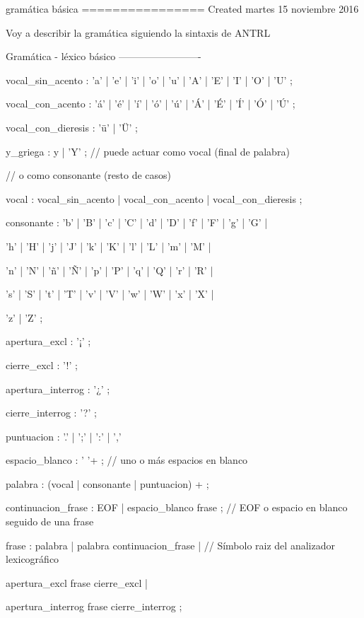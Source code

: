 \documentclass{minimal}
\begin{document}
    gramática básica
    ================
    Created martes 15 noviembre 2016
    
    Voy a describir la gramática siguiendo la sintaxis de ANTRL
    
    Gramática - léxico básico
    -------------------------
    
    vocal\_sin\_acento	: 'a' | 'e' | 'i' | 'o' | 'u' | 'A' | 'E' | 'I' | 'O' | 'U' ;
    
    vocal\_con\_acento	: 'á' | 'é' | 'í' | 'ó' | 'ú' | 'Á' | 'É' | 'Í' | 'Ó' | 'Ú' ;
    
    vocal\_con\_dieresis	: 'ü' | 'Ü' ;
    
    y\_griega		: y | 'Y' ;							// puede actuar como vocal (final de palabra) 
    
    // o como consonante (resto de casos)
    
    vocal			: vocal\_sin\_acento | vocal\_con\_acento | vocal\_con\_dieresis ;
    
    consonante		: 'b' | 'B' | 'c' | 'C' | 'd' | 'D' | 'f' | 'F' | 'g' | 'G' |
    
    'h' | 'H' | 'j' | 'J' | 'k' | 'K' | 'l' | 'L' | 'm' | 'M' |
    
    'n' | 'N' | 'ñ' | 'Ñ' | 'p' | 'P' | 'q' | 'Q' | 'r' | 'R' |
    
    's' | 'S' | 't' | 'T' | 'v' | 'V' | 'w' | 'W' | 'x' | 'X' |
    
    'z' | 'Z' ;
    
    apertura\_excl		: '¡' ;
    
    cierre\_excl		: '!' ;
    
    apertura\_interrog	: '¿' ;
    
    cierre\_interrog		: '?' ;
    
    puntuacion		: '.' | ';' | ':' | ','
    
    espacio\_blanco		: ' '+ ; 							 // uno o más espacios en blanco
    
    palabra			: (vocal | consonante | puntuacion) + ;
    
    continuacion\_frase	: EOF | espacio\_blanco frase ;					// EOF o espacio en blanco seguido de una frase
    
    frase			: palabra | palabra continuacion\_frase | 			// Símbolo raiz del analizador lexicográfico
    
    apertura\_excl frase cierre\_excl |
    
    apertura\_interrog frase cierre\_interrog ;
    
\end{document}
